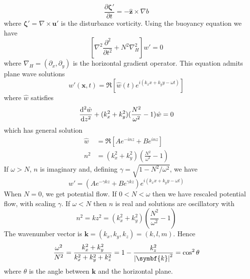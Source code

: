 \documentclass{jknotes}
\begin{document}
\begin{equation}
	\frac{\partial \symbf{\zeta}'}{\partial t} = -\hat{\symbf{z}}\times\nabla
	b
\end{equation}
where $\symbf{\zeta}' = \nabla \times \symbf{u}'$ is the disturbance
vorticity. Using the buoyancy equation we have
\begin{equation}
	\left[ \nabla^2 \frac{\partial^2}{\partial t^2} + N^2 \nabla_H^2\right] w'
	= 0
\end{equation}
where $\nabla_H = (\partial_x,\partial_y)$ is the horizontal gradient
operator. This equation admits plane wave solutions
\begin{equation}
	w'(\symbf{x},t) = \Re\left[ \hat{w}(t) e^{i(k_x x + k_y y - \omega
	t)}\right]
\end{equation}
where $\hat{w}$ satisfies
\begin{equation}
	\frac{\diffd^2 \hat{w}}{\diffd z^2} + (k_x^2 + k_y^2)(\frac{N^2}{\omega^2}
	- 1) \hat{w} = 0
\end{equation}
which has general solution
\begin{align}
	\hat{w} &= \Re\left[ A e^{-inz} + Be^{inz}\right] \\
	n^2 &= (k_x^2 + k_y^2)(\frac{N^2}{\omega^2} - 1)
\end{align}
If $\omega > N$, $n$ is imaginary and, defining $\gamma =
\sqrt{1-N^2/\omega^2}$, we have
\begin{equation}
	w' = (A e^{-\gamma k z} + B e^{\gamma kz}) e^{i(k_x x + k_y y - \omega
	t)}
\end{equation}
When $N = 0$, we get potential flow. If $0 < N < \omega$ then we have rescaled
potential flow, with scaling $\gamma$. If $\omega < N$ then $n$ is real and
solutions are oscillatory with
\begin{equation}
	n^2 = k z^2 = (k_x^2 + k_y^2)(\frac{N^2}{\omega^2} - 1)
\end{equation}
The wavenumber vector is $\symbf{k} = (k_x, k_y, k_z) = (k,l,m)$. Hence
\begin{equation}
	\frac{\omega^2}{N^2} = \frac{k_x^2 + k_y^2}{k_x^2+k_y^2+k_z^2} = 1 -
	\frac{k_z^2}{\abs{\symbf{k}}^2} = \cos^2 \theta
\end{equation}
where $\theta$ is the angle between $\symbf{k}$ and the horizontal plane.
\end{document}
